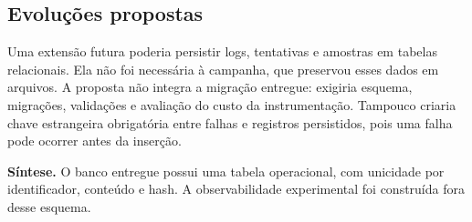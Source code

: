\subsection{Evoluções propostas}
Uma extensão futura poderia persistir logs, tentativas e amostras em tabelas relacionais. Ela não foi necessária à campanha, que preservou esses dados em arquivos. A proposta não integra a migração entregue: exigiria esquema, migrações, validações e avaliação do custo da instrumentação. Tampouco criaria chave estrangeira obrigatória entre falhas e registros persistidos, pois uma falha pode ocorrer antes da inserção.

\textbf{Síntese.} O banco entregue possui uma tabela operacional, com unicidade por identificador, conteúdo e hash. A observabilidade experimental foi construída fora desse esquema.
